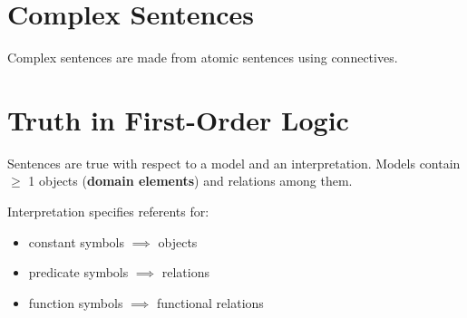 \documentclass[11pt]{article}
\begin{document}
\section{Complex Sentences}
\label{sec:orgc1fd98a}
Complex sentences are made from atomic sentences using connectives.

\section{Truth in First-Order Logic}
\label{sec:org4d31ee1}
Sentences are true with respect to a model and an interpretation.
Models contain \(\ge\) 1 objects (\textbf{domain elements}) and relations among them.

Interpretation specifies referents for:
\begin{itemize}
\item constant symbols \(\implies\) objects
\item predicate symbols \(\implies\) relations
\item function symbols \(\implies\) functional relations
\end{itemize}
\end{document}
